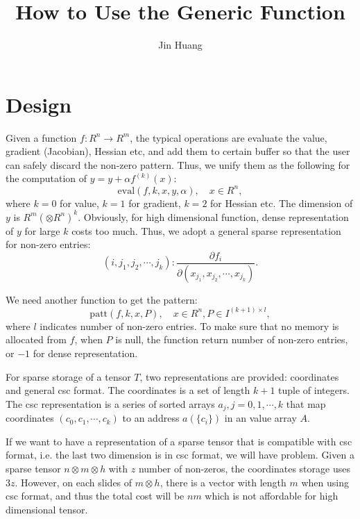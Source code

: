 \documentclass[9pt,twocolumn]{extarticle}
\title{How to Use the Generic Function}
\author{Jin Huang}
\begin{document}
\maketitle

\section{Design}
Given a function $f:R^n\rightarrow R^m$, the typical operations are
evaluate the value, gradient (Jacobian), Hessian etc, and add them to
certain buffer so that the user can safely discard the non-zero
pattern.  Thus, we unify them as the following for the computation of
$y = y+\alpha f^{(k)}(x)$:
\begin{equation}
  \mbox{eval}(f, k, x, y, \alpha), \quad x \in R^n,
\end{equation}
where $k=0$ for value, $k=1$ for gradient, $k=2$ for Hessian etc.  The
dimension of $y$ is $R^m(\otimes R^n)^k$.  Obviously, for high
dimensional function, dense representation of $y$ for large $k$ costs
too much.  Thus, we adopt a general sparse representation for non-zero
entries:
\begin{equation}
  (i, j_1, j_2, \cdots, j_k): \frac{\partial f_i}{\partial (x_{j_1}, x_{j_2}, \cdots, x_{j_k})}.
\end{equation}

We need another function to get the pattern:
\begin{equation}
  \mbox{patt}(f, k, x, P), \quad x \in R^n, P \in I^{(k+1)\times l},
\end{equation}
where $l$ indicates number of non-zero entries.  To make sure that no
memory is allocated from $f$, when $P$ is null, the function return
number of non-zero entries, or $-1$ for dense representation.

For sparse storage of a tensor $T$, two representations are provided:
coordinates and general csc format.  The coordinates is a set of
length $k+1$ tuple of integers.  The csc representation is a series of
sorted arrays $a_j, j = 0, 1, \cdots, k$ that map coordinates $(c_0,
c_1, \cdots, c_k)$ to an address $a(\{c_i\})$ in an value array $A$.

If we want to have a representation of a sparse tensor that is
compatible with csc format, i.e. the last two dimension is in csc
format, we will have problem. Given a sparse tensor $n \otimes m
\otimes h$ with $z$ number of non-zeros, the coordinates storage uses
$3z$.  However, on each slides of $m \otimes h$, there is a vector
with length $m$ when using csc format, and thus the total cost will be
$nm$ which is not affordable for high dimensional tensor.
\end{document}
